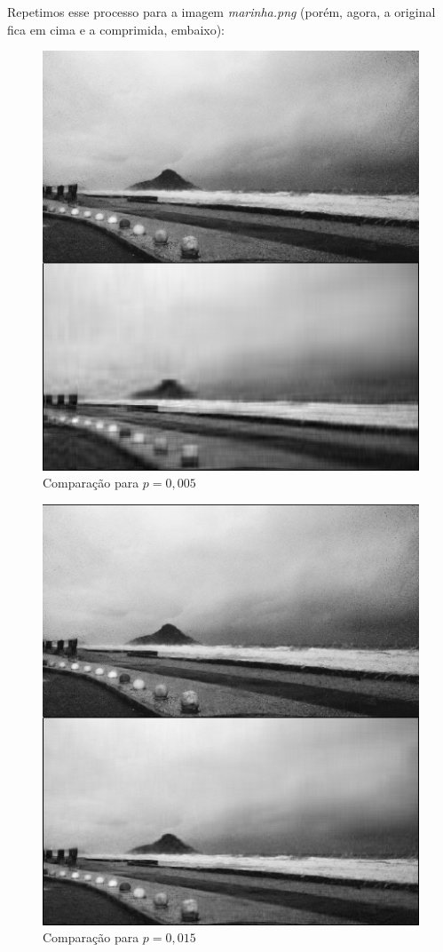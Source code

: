 \documentclass[11pt]{article}
\begin{document}
\begin{enumerate}
            Repetimos esse processo para a imagem \textit{marinha.png} (porém, agora, a original fica em cima e a comprimida, embaixo):
            
            \begin{figure}[]
                \centering
                \includegraphics[]{2-2-005}
                \caption{Comparação para $p = 0,005$}
            \end{figure}
            
            \begin{figure}[]
                \centering
                \includegraphics[]{2-2-015}
                \caption{Comparação para $p = 0,015$}
            \end{figure}
            

\end{enumerate}
\end{document}
